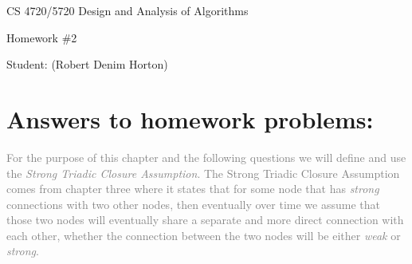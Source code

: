\documentclass[11pt]{article}
\begin{document}
 

\rhead{\today}

\begin{center}\begin{Large}
CS 4720/5720 Design and Analysis of Algorithms

Homework \#2

Student: (Robert Denim Horton)
\end{Large}
\end{center}


\section*{Answers to homework problems:}
\textcolor{gray}{
For the purpose of this chapter and the following questions we will define and use the \textit{Strong Triadic Closure Assumption}.  The Strong Triadic Closure Assumption comes from chapter three where it states that for some node that has \textit{strong} connections with two other nodes, then eventually over time we assume that those two nodes will eventually share a separate and more direct connection with each other, whether the connection between the two nodes will be either \textit{weak} or \textit{strong}.\\\\
}
\end{document}
